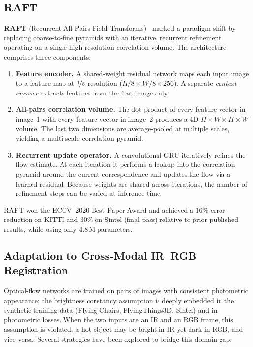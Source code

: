 \subsection{RAFT}

\textbf{RAFT} (Recurrent All-Pairs Field Transforms)~\cite{teed2020raft}
marked a paradigm shift by replacing coarse-to-fine pyramids with an
iterative, recurrent refinement operating on a single high-resolution
correlation volume.  The architecture comprises three components:

\begin{enumerate}
    \item \textbf{Feature encoder.} A shared-weight residual network
          maps each input image to a feature map at $\nicefrac{1}{8}$
          resolution ($H/8 \times W/8 \times 256$).  A separate
          \emph{context encoder} extracts features from the first image
          only.
    \item \textbf{All-pairs correlation volume.}  The dot product of
          every feature vector in image~1 with every feature vector in
          image~2 produces a 4D $H \times W \times H \times W$ volume.
          The last two dimensions are average-pooled at multiple scales,
          yielding a multi-scale correlation pyramid.
    \item \textbf{Recurrent update operator.}  A convolutional GRU
          iteratively refines the flow estimate.  At each iteration it
          performs a lookup into the correlation pyramid around the
          current correspondence and updates the flow via a learned
          residual.  Because weights are shared across iterations, the
          number of refinement steps can be varied at inference time.
\end{enumerate}

RAFT won the ECCV~2020 Best Paper Award and achieved a 16\% error
reduction on KITTI and 30\% on Sintel (final pass) relative to
prior published results, while using only 4.8\,M parameters.

\subsection{Adaptation to Cross-Modal IR--RGB Registration}

Optical-flow networks are trained on pairs of images with consistent
photometric appearance; the brightness constancy assumption is deeply
embedded in the synthetic training data (Flying Chairs, FlyingThings3D,
Sintel) and in photometric losses.  When the two inputs are an IR and an
RGB frame, this assumption is violated: a hot object may be bright in IR
yet dark in RGB, and vice versa.  Several strategies have been explored
to bridge this domain gap:

